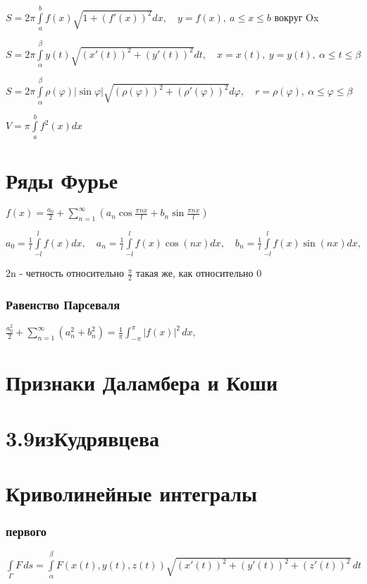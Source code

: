 $S=2\pi \int \limits _{a}^{b}f(x){\sqrt  {1+\left(f'(x)\right)^{2}}}dx, \quad y=f(x),\ a\leq x\leq b$ вокруг Ox

$S=2\pi \int \limits _{\alpha }^{\beta }y(t){\sqrt  {\left(x'(t)\right)^{2}+\left(y'(t)\right)^{2}}}dt, \quad x=x(t),\ y=y(t),\ \alpha \leq t\leq \beta  $

$S=2\pi \int \limits _{\alpha }^{\beta }\rho (\varphi )|\sin \varphi |{\sqrt  {\left(\rho (\varphi )\right)^{2}+\left(\rho '(\varphi )\right)^{2}}}d\varphi, \quad r=\rho (\varphi ),\ \alpha \leq \varphi \leq \beta $

$V=\pi \int \limits _{a}^{b}f^{2}(x)dx$


\section{Ряды Фурье}

$f(x)=\frac{a_0}{2} + \sum^{\infty}_{n=1} (a_n \cos \frac{\pi n x}{l} + b_n \sin \frac{\pi n x}{l})$

$a_0= \frac{1}{l}\int\limits_{-l}^{l}f(x)dx, \quad a_n= \frac{1}{l}\int\limits_{-l}^{l}f(x)\cos(nx)dx, \quad b_n= \frac{1}{l}\int\limits_{-l}^{l}f(x)\sin(nx)dx,$

2n - четность относительно $\frac {\pi}{2}$ такая же, как относительно 0

\subsubsection{Равенство Парсеваля} 
$\frac {a_0^2}{2} + \sum _{{n=1}}^{\infty }(a_n^2 +b_n^2)={\frac  {1}{\pi }}\int _{{-\pi }}^{\pi }|f(x)|^{2}\,dx,$

\section{Признаки Даламбера и Коши}

\section{3.9изКудрявцева}

\section{Криволинейные интегралы}
\subsubsection{первого}
$\int\limits_{\Gamma} F\, ds = \int\limits_{\alpha}^{\beta} F(x(t),y(t),z(t))\sqrt{(x'(t))^2+(y'(t))^2+(z'(t))^2}\,dt$
